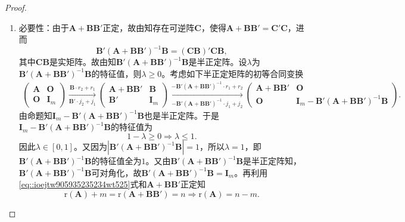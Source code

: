 \documentclass[../../main.tex]{subfiles}
\begin{document}
\begin{proof}
\begin{enumerate}[(1)]
\item {\heiti 必要性：}由于$\boldsymbol{A}+\boldsymbol{BB}'$正定，故由知存在可逆阵$\boldsymbol{C}$，使得$\boldsymbol{A}+\boldsymbol{BB}'=\boldsymbol{C}'\boldsymbol{C}$，进而
$$\boldsymbol{B}'\left( \boldsymbol{A}+\boldsymbol{BB}' \right) ^{-1}\boldsymbol{B}=\left( \boldsymbol{CB} \right) '\boldsymbol{CB},$$
其中$\boldsymbol{CB}$是实矩阵。故由知$\boldsymbol{B}'\left( \boldsymbol{A}+\boldsymbol{BB}' \right) ^{-1}\boldsymbol{B}$是半正定阵。设$\lambda$为$\boldsymbol{B}'\left( \boldsymbol{A}+\boldsymbol{BB}' \right) ^{-1}\boldsymbol{B}$的特征值，则$\lambda \geqslant 0$。考虑如下半正定矩阵的初等合同变换
\begin{align}
\begin{pmatrix} 
\boldsymbol{A} & \boldsymbol{O} \\ 
\boldsymbol{O} & \boldsymbol{I}_m 
\end{pmatrix} 
\xrightarrow[\boldsymbol{B}' \cdot j_2 + j_1]{\boldsymbol{B} \cdot r_2 + r_1} 
\begin{pmatrix} 
\boldsymbol{A} + \boldsymbol{BB}' & \boldsymbol{B} \\ 
\boldsymbol{B}' & \boldsymbol{I}_m 
\end{pmatrix} 
\xrightarrow[-\boldsymbol{B}'(\boldsymbol{A} + \boldsymbol{BB}')^{-1} \cdot j_1 + j_2]{-\boldsymbol{B}'(\boldsymbol{A} + \boldsymbol{BB}')^{-1} \cdot r_1 + r_2} 
\begin{pmatrix} 
\boldsymbol{A} + \boldsymbol{BB}' & \boldsymbol{O} \\ 
\boldsymbol{O} & \boldsymbol{I}_m - \boldsymbol{B}'(\boldsymbol{A} + \boldsymbol{BB}')^{-1}\boldsymbol{B} 
\end{pmatrix}. \label{eq::ioejtw905935235234wt525}
\end{align}
由命题知$\boldsymbol{I}_m-\boldsymbol{B}'\left( \boldsymbol{A}+\boldsymbol{BB}' \right) ^{-1}\boldsymbol{B}$也是半正定阵。于是$\boldsymbol{I}_m-\boldsymbol{B}'\left( \boldsymbol{A}+\boldsymbol{BB}' \right) ^{-1}\boldsymbol{B}$的特征值为
$$1-\lambda \geqslant 0\Longrightarrow \lambda \leqslant 1.$$
因此$\lambda \in \left[ 0,1 \right]$。又因为$\left| \boldsymbol{B}'\left( \boldsymbol{A}+\boldsymbol{BB}' \right) ^{-1}\boldsymbol{B} \right|=1$，所以$\lambda =1$，即$\boldsymbol{B}'\left( \boldsymbol{A}+\boldsymbol{BB}' \right) ^{-1}\boldsymbol{B}$的特征值全为$1$。又由$\boldsymbol{B}'\left( \boldsymbol{A}+\boldsymbol{BB}' \right) ^{-1}\boldsymbol{B}$是半正定阵知，$\boldsymbol{B}'\left( \boldsymbol{A}+\boldsymbol{BB}' \right) ^{-1}\boldsymbol{B}$可对角化，故$\boldsymbol{B}'\left( \boldsymbol{A}+\boldsymbol{BB}' \right) ^{-1}\boldsymbol{B}=\boldsymbol{I}_m$。再利用\eqref{eq::ioejtw905935235234wt525}式和$\boldsymbol{A}+\boldsymbol{BB}'$正定知
$$\mathrm{r}\left( \boldsymbol{A} \right) +m=\mathrm{r}\left( \boldsymbol{A}+\boldsymbol{BB}' \right) =n\Longrightarrow \mathrm{r}\left( \boldsymbol{A} \right) =n-m.$$



\end{enumerate}
\end{proof}
\end{document}
